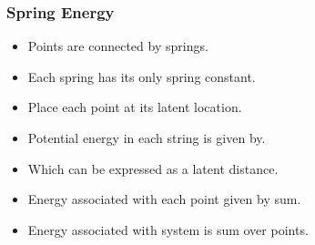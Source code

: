 \subsubsection{Spring Energy}
\begin{itemize}
\item Points are connected by springs.
\item Each spring has its only spring constant.
\item Place each point at its latent location.
\item Potential energy in each string is given by.
\item Which can be expressed as a latent distance.
\item Energy associated with each point given by sum.
\item Energy associated with system is sum over points.
\end{itemize}
